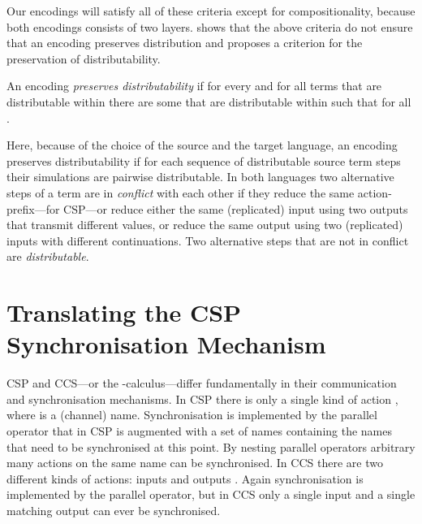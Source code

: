\documentclass[]{eptcs}
\begin{document}
Our encodings will satisfy all of these criteria except for compositionality, because both encodings consists of two layers.
\cite{petersNestmannGoltz13} shows that the above criteria do not ensure that an encoding preserves distribution and proposes a criterion for the preservation of distributability.

\begin{definition}
	\label{def:distributabilityPreservation}

	An encoding  \emph{preserves distributability} if for every  and for all terms  that are distributable within  there are some  that are distributable within  such that  for all .
\end{definition}

\noindent
Here, because of the choice of the source and the target language, an encoding preserves distributability if for each sequence of distributable source term steps their simulations are pairwise distributable. In both languages two alternative steps of a term are in \emph{conflict} with each other if they reduce the same action-prefix---for CSP---or reduce either the same (replicated) input using two outputs that transmit different values, or reduce the same output using two (replicated) inputs with different continuations. Two alternative steps that are not in conflict are \emph{distributable}.

\section{Translating the CSP Synchronisation Mechanism}
\label{sec:innerPart}

CSP and CCS---or the -calculus---differ fundamentally in their communication and synchronisation mechanisms.
In CSP there is only a single kind of action , where  is a (channel) name. Synchronisation is implemented by the parallel operator  that in CSP is augmented with a set of names  containing the names that need to be synchronised at this point. By nesting parallel operators arbitrary many actions on the same name can be synchronised.
In CCS there are two different kinds of actions: inputs  and outputs . Again synchronisation is implemented by the parallel operator, but in CCS only a single input and a single matching output can ever be synchronised.
\end{document}

